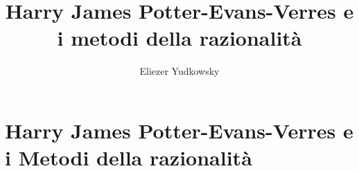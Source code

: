 \documentclass[target=mst]{thud}[2014/03/11]
\title{Harry James Potter-Evans-Verres e i metodi della razionalità}
\author{Eliezer Yudkowsky}
\begin{document}

\maketitle




\tableofcontents



\mainmatter




\chapter*{Harry James Potter-Evans-Verres e i Metodi della razionalità}
























%

\backmatter



\newpage


%

\end{document}
